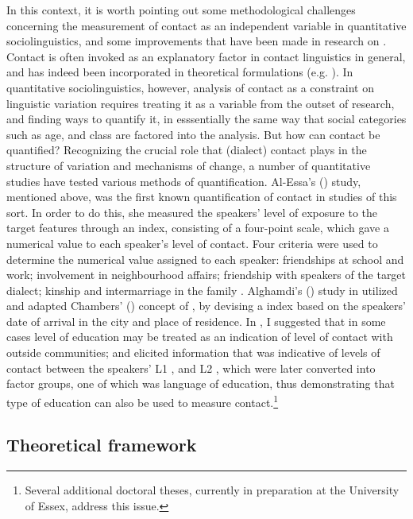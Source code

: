 \documentclass[output=paper]{langsci/langscibook}
\begin{document}
In this context, it is worth pointing out some methodological challenges concerning the measurement of contact as an independent variable in quantitative sociolinguistics, and some improvements that have been made in research on . Contact is often invoked as an explanatory factor in contact linguistics in general, and has indeed been incorporated in theoretical formulations (e.g. \citealt{ThomasonKaufman1988}). In quantitative sociolinguistics, however, analysis of contact as a constraint on linguistic variation requires treating it as a variable from the outset of research, and finding ways to quantify it, in esssentially the same way that social categories such as age,  and class are factored into the analysis. But how can contact be quantified? Recognizing the crucial role that (dialect) contact plays in the structure of variation and mechanisms of change, a number of quantitative studies have tested various methods of quantification. Al-Essa's (\citeyear{Al-Essa2009}) study, mentioned above, was the first known quantification of contact in studies of this sort. In order to do this, she measured the speakers’ level of exposure to the target features through an index, consisting of a four-point scale, which gave a numerical value to each speaker’s level of contact. Four criteria were used to determine the numerical value assigned to each speaker: friendships at school and work; involvement in neighbourhood affairs; friendship with speakers of the target dialect; kinship and intermarriage in the family \citep[208]{Al-Essa2009}. Alghamdi's (\citeyear{Alghamdi2014}) study in  utilized and adapted Chambers' (\citeyear{Chambers2000}) concept of , by devising a  index based on the speakers’ date of arrival in the city and place of residence. In \citet{Al-Wer2002}, I suggested that in some cases level of education may be treated as an indication of level of contact with outside communities; and \citet{Horesh2014} elicited information that was indicative of levels of contact between the speakers’ L1 , and L2 , which were later converted into factor groups, one of which was language of education, thus demonstrating that type of education can also be used to measure contact.\footnote{Several additional doctoral theses, currently in preparation at the University of Essex, address this issue.}

\subsection{Theoretical framework}
\end{document}
